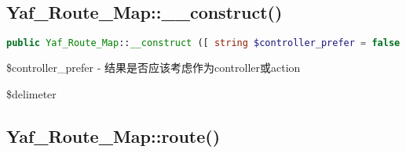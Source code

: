 \subsection{Yaf\_Route\_Map::\_\_construct()}


\begin{lstlisting}[language=PHP]
public Yaf_Route_Map::__construct ([ string $controller_prefer = false [, string $delimiter = '' ]] )
\end{lstlisting}

\begin{compactitem}
\item \$controller\_prefer - 结果是否应该考虑作为controller或action
\item \$delimeter
\end{compactitem}



\subsection{Yaf\_Route\_Map::route()}


\begin{lstlisting}[language=PHP]

\end{lstlisting}




\begin{lstlisting}[language=PHP]

\end{lstlisting}



\begin{lstlisting}[language=PHP]

\end{lstlisting}




\begin{lstlisting}[language=PHP]

\end{lstlisting}



\begin{lstlisting}[language=PHP]

\end{lstlisting}




\begin{lstlisting}[language=PHP]

\end{lstlisting}



